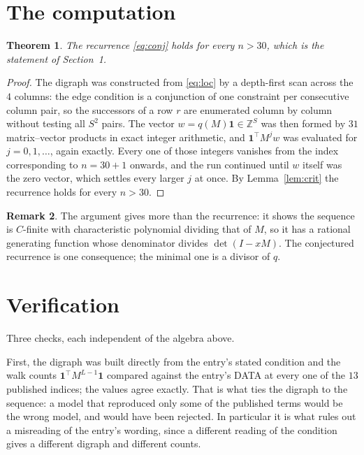 \documentclass[11pt,a4paper]{article}
\theoremstyle{plain}
\newtheorem{theorem}{Theorem}
\theoremstyle{definition}
\newtheorem{remark}[theorem]{Remark}
\begin{document}
\section{The computation}

\begin{theorem}
The recurrence \eqref{eq:conj} holds for every $n>30$, which is the statement of
Section~1.
\end{theorem}

\begin{proof}
The digraph was constructed from \eqref{eq:loc} by a depth-first scan across the $4$
columns: the edge condition is a conjunction of one constraint per consecutive column
pair, so the successors of a row $r$ are enumerated column by column without testing all
$S^2$ pairs. The vector $w=q(M)\mathbf{1}\in\mathbb{Z}^{S}$ was then formed by $31$
matrix--vector products in exact integer arithmetic, and $\mathbf{1}^{\!\top}M^{j}w$ was
evaluated for $j=0,1,\dots$, again exactly. Every one of those integers vanishes from the
index corresponding to $n=30+1$ onwards, and the run continued until $w$ itself was the
zero vector, which settles every larger $j$ at once. By Lemma~\ref{lem:crit} the recurrence
holds for every $n>30$.
\end{proof}

\begin{remark}
The argument gives more than the recurrence: it shows the sequence is $C$-finite with
characteristic polynomial dividing that of $M$, so it has a rational generating function
whose denominator divides $\det(I-xM)$. The conjectured recurrence is one consequence; the
minimal one is a divisor of $q$.
\end{remark}

\section{Verification}

Three checks, each independent of the algebra above.

First, the digraph was built directly from the entry's stated condition and the walk counts
$\mathbf{1}^{\!\top}M^{L-1}\mathbf{1}$ compared against the entry's DATA at
every one of the $13$ published indices; the values agree exactly. That is what ties
the digraph to the sequence: a model that reproduced only some of the published terms would
be the wrong model, and would have been rejected. In particular it is what rules out a
misreading of the entry's wording, since a different reading of the condition gives a
different digraph and different counts.
\end{document}
